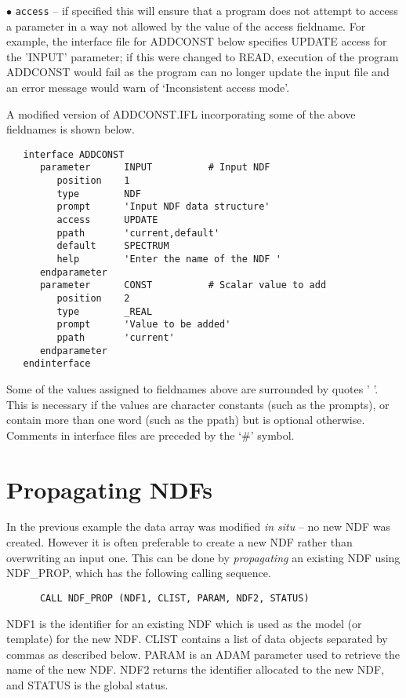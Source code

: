 \begin{description}
\item{$\bullet$ \tt access} -- if specified this will ensure that a program 
does not attempt to access a parameter in a way not allowed by the 
value of the access fieldname.
For example, the interface file for ADDCONST below specifies UPDATE access
for the 'INPUT' parameter;
if this
were changed to READ, execution of the program ADDCONST would fail as the 
program can no longer update the input file and 
an error message would warn of 
`Inconsistent access mode'.
\end{description}
A modified version of ADDCONST.IFL incorporating some of the above 
fieldnames is shown below.
\begin{verbatim}
   interface ADDCONST
      parameter      INPUT          # Input NDF
         position    1
         type        NDF
         prompt      'Input NDF data structure'
         access      UPDATE
         ppath       'current,default'
         default     SPECTRUM
         help        'Enter the name of the NDF '
      endparameter
      parameter      CONST          # Scalar value to add
         position    2
         type        _REAL
         prompt      'Value to be added'
         ppath       'current'
      endparameter
   endinterface
\end{verbatim}
Some of the values assigned to fieldnames above are surrounded by quotes ' '.
This is necessary if the values are character constants (such as the prompts),
or contain more than one word (such as the ppath)  but is optional otherwise.
Comments in interface files are preceded by the `\#' symbol.

\newpage
\section{Propagating NDFs\label{prop}}

In the previous  example the data array was modified {\sl in situ} --
no new NDF was created.
However it is often preferable to create a new NDF rather than overwriting an
input one.
This can be done by {\sl propagating\/} an existing NDF using
NDF\_PROP, which has the following calling sequence.
\begin{verbatim}
      CALL NDF_PROP (NDF1, CLIST, PARAM, NDF2, STATUS)
\end{verbatim}	
NDF1 is the identifier for an existing NDF which is used 
as the model (or template) for the new NDF.
CLIST contains a list of data objects separated by commas as described 
below.
PARAM is an ADAM parameter used to retrieve the name of the new  NDF.
NDF2 returns the identifier allocated to the new NDF, and STATUS is the global 
status.


